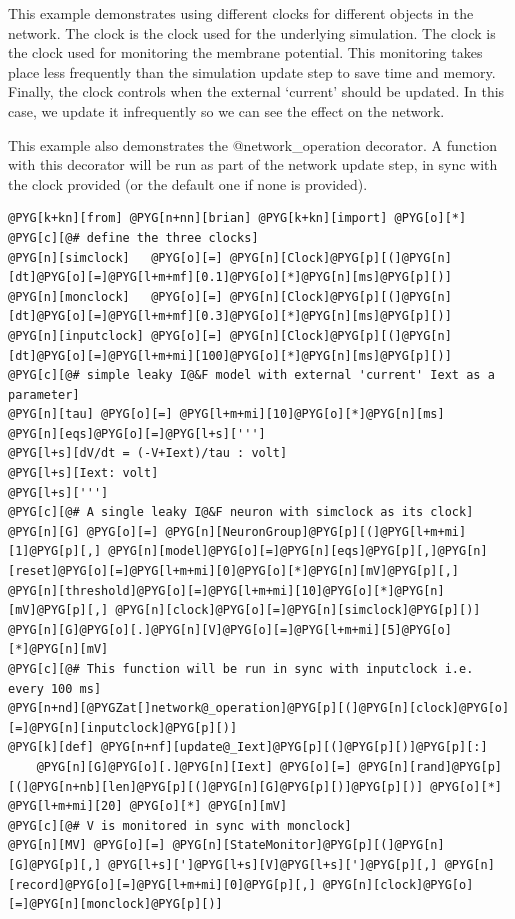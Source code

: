 \documentclass[letterpaper,10pt,english]{manual}
\begin{document}
This example demonstrates using different clocks for different objects
in the network. The clock  is the clock used for the
underlying simulation. The clock  is the clock used for
monitoring the membrane potential. This monitoring takes place less
frequently than the simulation update step to save time and memory.
Finally, the clock  controls when the external `current'
 should be updated. In this  case, we update it infrequently
so we can see the effect on the network.

This example also demonstrates the @network\_operation decorator. A
function with this decorator will be run as part of the network
update step, in sync with the clock provided (or the default one
if none is provided).

\begin{Verbatim}[commandchars=@\[\]]
@PYG[k+kn][from] @PYG[n+nn][brian] @PYG[k+kn][import] @PYG[o][*]
@PYG[c][@# define the three clocks]
@PYG[n][simclock]   @PYG[o][=] @PYG[n][Clock]@PYG[p][(]@PYG[n][dt]@PYG[o][=]@PYG[l+m+mf][0.1]@PYG[o][*]@PYG[n][ms]@PYG[p][)]
@PYG[n][monclock]   @PYG[o][=] @PYG[n][Clock]@PYG[p][(]@PYG[n][dt]@PYG[o][=]@PYG[l+m+mf][0.3]@PYG[o][*]@PYG[n][ms]@PYG[p][)]
@PYG[n][inputclock] @PYG[o][=] @PYG[n][Clock]@PYG[p][(]@PYG[n][dt]@PYG[o][=]@PYG[l+m+mi][100]@PYG[o][*]@PYG[n][ms]@PYG[p][)]
@PYG[c][@# simple leaky I@&F model with external 'current' Iext as a parameter]
@PYG[n][tau] @PYG[o][=] @PYG[l+m+mi][10]@PYG[o][*]@PYG[n][ms]
@PYG[n][eqs]@PYG[o][=]@PYG[l+s][''']
@PYG[l+s][dV/dt = (-V+Iext)/tau : volt]
@PYG[l+s][Iext: volt]
@PYG[l+s][''']
@PYG[c][@# A single leaky I@&F neuron with simclock as its clock]
@PYG[n][G] @PYG[o][=] @PYG[n][NeuronGroup]@PYG[p][(]@PYG[l+m+mi][1]@PYG[p][,] @PYG[n][model]@PYG[o][=]@PYG[n][eqs]@PYG[p][,]@PYG[n][reset]@PYG[o][=]@PYG[l+m+mi][0]@PYG[o][*]@PYG[n][mV]@PYG[p][,] @PYG[n][threshold]@PYG[o][=]@PYG[l+m+mi][10]@PYG[o][*]@PYG[n][mV]@PYG[p][,] @PYG[n][clock]@PYG[o][=]@PYG[n][simclock]@PYG[p][)]
@PYG[n][G]@PYG[o][.]@PYG[n][V]@PYG[o][=]@PYG[l+m+mi][5]@PYG[o][*]@PYG[n][mV]
@PYG[c][@# This function will be run in sync with inputclock i.e. every 100 ms]
@PYG[n+nd][@PYGZat[]network@_operation]@PYG[p][(]@PYG[n][clock]@PYG[o][=]@PYG[n][inputclock]@PYG[p][)]
@PYG[k][def] @PYG[n+nf][update@_Iext]@PYG[p][(]@PYG[p][)]@PYG[p][:]
    @PYG[n][G]@PYG[o][.]@PYG[n][Iext] @PYG[o][=] @PYG[n][rand]@PYG[p][(]@PYG[n+nb][len]@PYG[p][(]@PYG[n][G]@PYG[p][)]@PYG[p][)] @PYG[o][*] @PYG[l+m+mi][20] @PYG[o][*] @PYG[n][mV]
@PYG[c][@# V is monitored in sync with monclock]
@PYG[n][MV] @PYG[o][=] @PYG[n][StateMonitor]@PYG[p][(]@PYG[n][G]@PYG[p][,] @PYG[l+s][']@PYG[l+s][V]@PYG[l+s][']@PYG[p][,] @PYG[n][record]@PYG[o][=]@PYG[l+m+mi][0]@PYG[p][,] @PYG[n][clock]@PYG[o][=]@PYG[n][monclock]@PYG[p][)]

\end{Verbatim}
\end{document}
